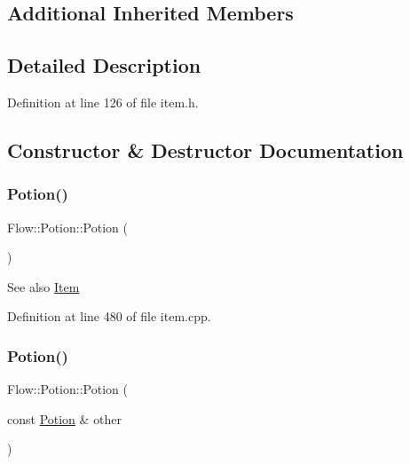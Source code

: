 \subsection*{Additional Inherited Members}


\subsection{Detailed Description}


Definition at line 126 of file item.\+h.



\subsection{Constructor \& Destructor Documentation}
\hypertarget{class_flow_1_1_potion_a630878668d1f8270f96d6d43c5dfa983}{}\label{class_flow_1_1_potion_a630878668d1f8270f96d6d43c5dfa983} 
\subsubsection{\texorpdfstring{Potion()}{Potion()}\hspace{0.1cm}{\footnotesize\ttfamily [1/4]}}
{\footnotesize\ttfamily Flow\+::\+Potion\+::\+Potion (\begin{DoxyParamCaption}{ }\end{DoxyParamCaption})}

\begin{DoxySeeAlso}{See also}
\hyperlink{class_flow_1_1_item}{Item} 
\end{DoxySeeAlso}


Definition at line 480 of file item.\+cpp.

\hypertarget{class_flow_1_1_potion_a22df1a4e224e653a6a37bff5b1f10983}{}\label{class_flow_1_1_potion_a22df1a4e224e653a6a37bff5b1f10983} 
\subsubsection{\texorpdfstring{Potion()}{Potion()}\hspace{0.1cm}{\footnotesize\ttfamily [2/4]}}
{\footnotesize\ttfamily Flow\+::\+Potion\+::\+Potion (\begin{DoxyParamCaption}\item[{const \hyperlink{class_flow_1_1_potion}{Potion} \&}]{other }\end{DoxyParamCaption})}

